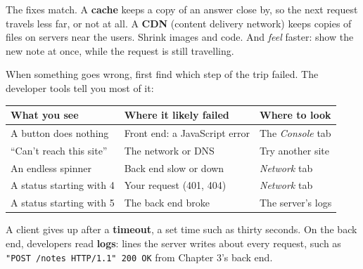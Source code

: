 \noindent{}The fixes match. A \textbf{cache} keeps a copy of an answer close by, so the next request travels less far, or not at all. A \textbf{CDN} (content delivery network) keeps copies of files on servers near the users. Shrink images and code. And \emph{feel} faster: show the new note at once, while the request is still travelling.

\label{webapp-05:failure-what-breaks-and-how-to-tell-where}

When something goes wrong, first find which step of the trip failed. The developer tools tell you most of it:


{\def\LTcaptype{none} %
\begin{longtable}[]{@{}
  >{\raggedright\arraybackslash}p{}
  >{\raggedright\arraybackslash}p{}
  >{\raggedright\arraybackslash}p{}@{}}
\toprule\noalign{}
\begin{minipage}[b]{\linewidth}\raggedright
What you see
\end{minipage} & \begin{minipage}[b]{\linewidth}\raggedright
Where it likely failed
\end{minipage} & \begin{minipage}[b]{\linewidth}\raggedright
Where to look
\end{minipage} \\
\midrule\noalign{}
\endhead
\bottomrule\noalign{}
\endlastfoot
A button does nothing & Front end: a JavaScript error & The \emph{Console} tab \\
``Can't reach this site'' & The network or DNS & Try another site \\
An endless spinner & Back end slow or down & \emph{Network} tab \\
A status starting with 4 & Your request (401, 404) & \emph{Network} tab \\
A status starting with 5 & The back end broke & The server's logs \\
\end{longtable}
}

A client gives up after a \textbf{timeout}, a set time such as thirty seconds. On the back end, developers read \textbf{logs}: lines the server writes about every request, such as \texttt{"POST\ /}\allowbreak{}\texttt{notes\ HTTP/}\allowbreak{}\texttt{1.}\allowbreak{}\texttt{1"\ 200\ OK} from Chapter 3's back end.

